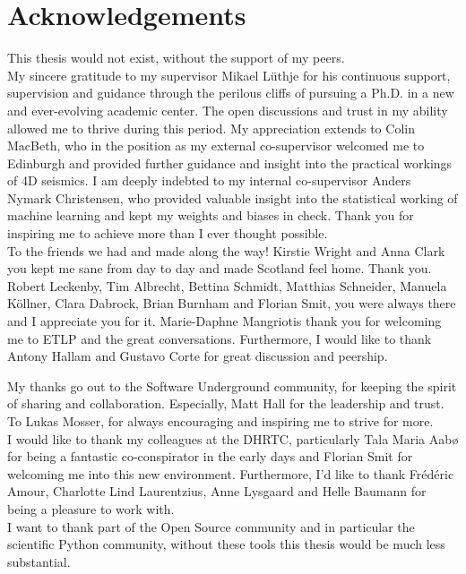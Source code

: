 \chapter{Acknowledgements}

This thesis would not exist, without the support of my peers.\\

My sincere gratitude to my supervisor Mikael L{\"u}thje for his continuous support, supervision and guidance through the perilous cliffs of pursuing a Ph.D. in a new and ever-evolving academic center. The open discussions and trust in my ability allowed me to thrive during this period. My appreciation extends to Colin MacBeth, who in the position as my external co-supervisor welcomed me to Edinburgh and provided further guidance and insight into the practical workings of 4D seismics. I am deeply indebted to my internal co-supervisor Anders Nymark Christensen, who provided valuable insight into the statistical working of machine learning and kept my weights and biases in check. Thank you for inspiring me to achieve more than I ever thought possible.\\

To the friends we had and made along the way! Kirstie Wright and Anna Clark you kept me sane from day to day and made Scotland feel home. Thank you. Robert Leckenby, Tim Albrecht, Bettina Schmidt, Matthias Schneider, Manuela K{\"o}llner, Clara Dabrock, Brian Burnham and Florian Smit, you were always there and I appreciate you for it. Marie-Daphne Mangriotis thank you for welcoming me to ETLP and the great conversations. Furthermore, I would like to thank Antony Hallam and Gustavo Corte for great discussion and peership.

My thanks go out to the Software Underground community, for keeping the spirit of sharing and collaboration. Especially, Matt Hall for the leadership and trust. To Lukas Mosser, for always encouraging and inspiring me to strive for more.\\

I would like to thank my colleagues at the DHRTC, particularly Tala Maria Aab{\o} for being a fantastic co-conspirator in the early days and Florian Smit for welcoming me into this new environment. Furthermore, I'd like to thank Fr{\'e}d{\'e}ric Amour, Charlotte Lind Laurentzius, Anne Lysgaard and Helle Baumann for being a pleasure to work with.\\

I want to thank part of the Open Source community and in particular the scientific Python community, without these tools this thesis would be much less substantial.

